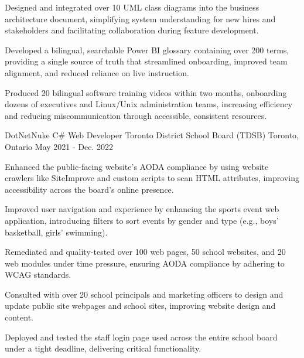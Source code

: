 \begin{cventries}
{\begin{cvitems}
    \item {Designed and integrated over 10 UML class diagrams into the business architecture document, simplifying system understanding for new hires and stakeholders and facilitating collaboration during feature development.}
    
    \item {Developed a bilingual, searchable Power BI glossary containing over 200 terms, providing a single source of truth that streamlined onboarding, improved team alignment, and reduced reliance on live instruction.}
    
    \item {Produced 20 bilingual software training videos within two months, onboarding dozens of executives and Linux/Unix administration teams, increasing efficiency and reducing miscommunication through accessible, consistent resources.}
    \end{cvitems}
  }

\cventry
  {DotNetNuke C\# Web Developer} %
  {Toronto District School Board (TDSB)} %
  {Toronto, Ontario} %
  {May 2021 - Dec. 2022} %
  {
    \begin{cvitems} %
      \item {Enhanced the public-facing website's AODA compliance by using website crawlers like SiteImprove and custom scripts to scan HTML attributes, improving accessibility across the board's online presence.}
    \item {Improved user navigation and experience by enhancing the sports event web application, introducing filters to sort events by gender and type (e.g., boys' basketball, girls' swimming).}
    \item {Remediated and quality-tested over 100 web pages, 50 school websites, and 20 web modules under time pressure, ensuring AODA compliance by adhering to WCAG standards.}
    \item {Consulted with over 20 school principals and marketing officers to design and update public site webpages and school sites, improving website design and content.}
    \item {Deployed and tested the staff login page used across the entire school board under a tight deadline, delivering critical functionality.}
    \end{cvitems}
  }



\end{cventries}
